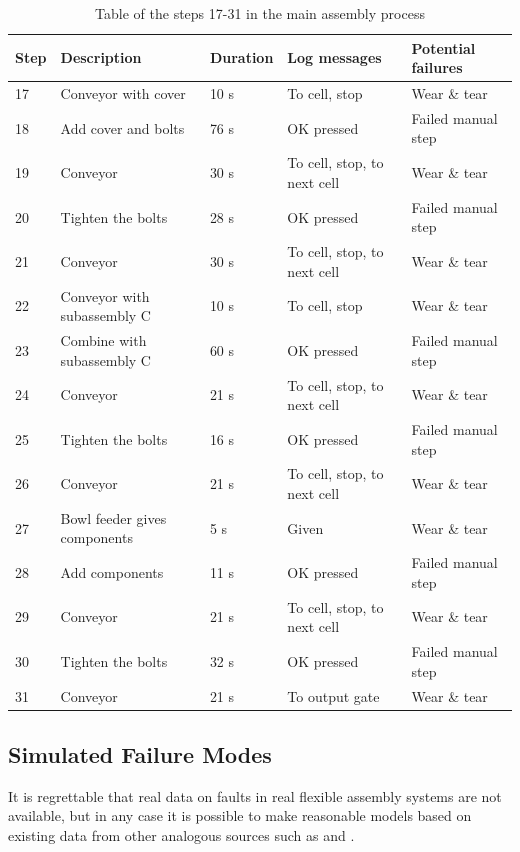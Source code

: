 \documentclass[journal]{IEEEtran}
\begin{document}
\begin{table}[!t]
\renewcommand{\arraystretch}{1.3}
\caption{Table of the steps 17-31 in the main assembly process}
\label{mainsteps2}
\centering
\begin{tabular}{|p{5mm}|p{20mm}|p{10mm}|p{15mm}|p{15mm}|}
\hline
Step & Description & Duration & Log messages & Potential failures \\
\hline
\hline
17 & Conveyor with cover & 10 s & To cell, stop & Wear \& tear \\
\hline
18 & Add cover and bolts & 76 s & OK pressed & Failed manual step \\
\hline
19 & Conveyor & 30 s & To cell, stop, to next cell & Wear \& tear \\
\hline
20 & Tighten the bolts & 28 s & OK pressed & Failed manual step \\
\hline
21 & Conveyor & 30 s & To cell, stop, to next cell & Wear \& tear \\
\hline
22 & Conveyor with subassembly C & 10 s & To cell, stop & Wear \& tear \\
\hline
23 & Combine with subassembly C & 60 s & OK pressed & Failed manual step \\
\hline
24 & Conveyor & 21 s & To cell, stop, to next cell & Wear \& tear \\
\hline
25 & Tighten the bolts & 16 s & OK pressed & Failed manual step \\
\hline
26 & Conveyor & 21 s & To cell, stop, to next cell & Wear \& tear \\
\hline
27 & Bowl feeder gives components & 5 s & Given & Wear \& tear \\
\hline
28 & Add components & 11 s & OK pressed & Failed manual step \\
\hline
29 & Conveyor & 21 s & To cell, stop, to next cell & Wear \& tear \\
\hline
30 & Tighten the bolts & 32 s & OK pressed & Failed manual step \\
\hline
31 & Conveyor & 21 s & To output gate & Wear \& tear \\
\hline
\end{tabular}
\end{table}

\subsection{Simulated Failure Modes}
It is regrettable that real data on faults in real flexible assembly systems are not available, but in any case it is possible to make reasonable
models based on existing data from other analogous sources such as \cite{nasaames} and \cite{tsarouhas2009classification}.
\end{document}
